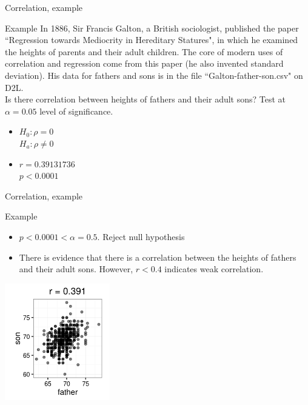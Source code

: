 \documentclass[xcolor=table]{beamer}
\begin{document}
\begin{frame}{Correlation, example}
\begin{exampleblock}{Example}
In 1886, Sir Francis Galton, a British sociologist, published the paper ``Regression towards Mediocrity in Hereditary Statures", in which he examined the heights of parents and their adult children. The core of modern uses of correlation and regression come from this paper (he also invented standard deviation). His data for fathers and sons is in the file ``Galton-father-son.csv" on D2L.\\
\medskip
Is there correlation between heights of fathers and their adult sons? Test at $\alpha = 0.05$ level of significance.
\begin{itemize}
\pause\item $H_0: \rho = 0$\\$H_a: \rho \ne 0$ 
\pause\item $r = 0.39131736$ \\ $p < 0.0001$
\end{itemize} 
\end{exampleblock}
\end{frame}

\begin{frame}{Correlation, example}
\begin{exampleblock}{Example}
\begin{itemize}
\item $p < 0.0001 < \alpha = 0.5$. Reject null hypothesis
\item There is evidence that there is a correlation between the heights of fathers and their adult sons. However, $r < 0.4$ indicates weak correlation.
\end{itemize} 
\end{exampleblock}
\medskip
{\centering
\includegraphics[width=1.8in]{../images/ch10_cor_galton}
\par}
\end{frame}
\end{document}
